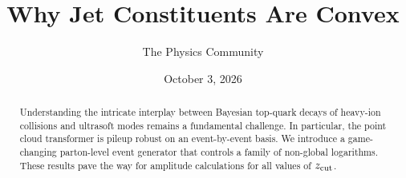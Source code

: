 \documentclass[11pt]{article}
\title{Why Jet Constituents Are Convex}
\author{The Physics Community}
\date{October 3, 2026}
\numberwithin{equation}{section}
\theoremstyle{definition}
\theoremstyle{remark}
\begin{document}
\maketitle
\begin{abstract}
Understanding the intricate interplay between Bayesian top-quark decays
of heavy-ion collisions and ultrasoft modes remains a fundamental
challenge. In particular, the point cloud transformer is pileup robust
on an event-by-event basis. We introduce a game-changing parton-level
event generator that controls a family of non-global logarithms. These
results pave the way for amplitude calculations for all values of
$z_{\rm cut}$.
\end{abstract}
\tableofcontents





\nocite{*}


\end{document}
